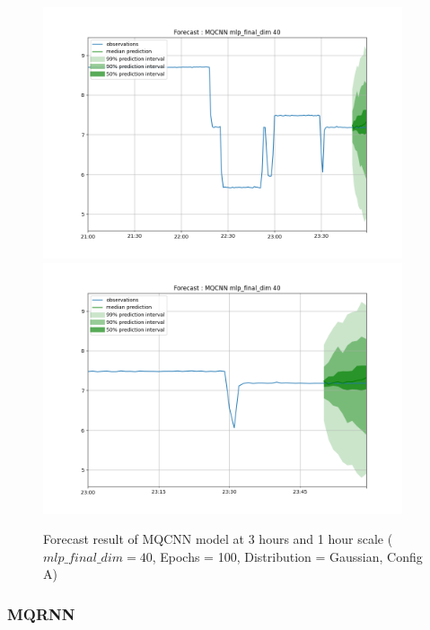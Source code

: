 \documentclass[a4paper, 12pt]{article}
\begin{document}
\begin{figure}[!h]
    \centering
    \includegraphics[width=400px]{plots/forecast/a/MQCNN/mlp_final_dim/40/180.png}
    \includegraphics[width=400px]{plots/forecast/a/MQCNN/mlp_final_dim/40/60.png}
    \caption{Forecast result of MQCNN model at 3 hours and 1 hour scale ($mlp\_final\_dim = 40 $, Epochs = 100, Distribution = Gaussian, Config A)}
    \label{fig:mqcnn}
\end{figure}

\subsubsection{MQRNN} \label{comp_mqrnn}
\end{document}

